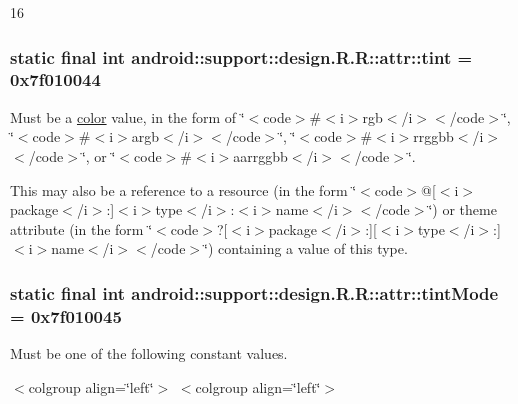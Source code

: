 16\hypertarget{classandroid_1_1support_1_1design_1_1_r_1_1attr_122cc123da6e4957cab7428341154de3}{
\subsubsection[{tint}]{\setlength{\rightskip}{0pt plus 5cm}static final int android::support::design.R.R::attr::tint = 0x7f010044}}
\label{classandroid_1_1support_1_1design_1_1_r_1_1attr_122cc123da6e4957cab7428341154de3}


Must be a \hyperlink{classandroid_1_1support_1_1design_1_1_r_1_1color}{color} value, in the form of \char`\"{}$<$code$>$\#$<$i$>$rgb$<$/i$>$$<$/code$>$\char`\"{}, \char`\"{}$<$code$>$\#$<$i$>$argb$<$/i$>$$<$/code$>$\char`\"{}, \char`\"{}$<$code$>$\#$<$i$>$rrggbb$<$/i$>$$<$/code$>$\char`\"{}, or \char`\"{}$<$code$>$\#$<$i$>$aarrggbb$<$/i$>$$<$/code$>$\char`\"{}. 

This may also be a reference to a resource (in the form \char`\"{}$<$code$>$@\mbox{[}$<$i$>$package$<$/i$>$:\mbox{]}$<$i$>$type$<$/i$>$:$<$i$>$name$<$/i$>$$<$/code$>$\char`\"{}) or theme attribute (in the form \char`\"{}$<$code$>$?\mbox{[}$<$i$>$package$<$/i$>$:\mbox{]}\mbox{[}$<$i$>$type$<$/i$>$:\mbox{]}$<$i$>$name$<$/i$>$$<$/code$>$\char`\"{}) containing a value of this type. \hypertarget{classandroid_1_1support_1_1design_1_1_r_1_1attr_f3e21a73621ed031507b172841198d4b}{
\subsubsection[{tintMode}]{\setlength{\rightskip}{0pt plus 5cm}static final int android::support::design.R.R::attr::tintMode = 0x7f010045}}
\label{classandroid_1_1support_1_1design_1_1_r_1_1attr_f3e21a73621ed031507b172841198d4b}


Must be one of the following constant values. \begin{TabularC}{0}
\hline
\end{TabularC}
$<$colgroup align=\char`\"{}left\char`\"{}$>$ $<$colgroup align=\char`\"{}left\char`\"{}$>$ 

